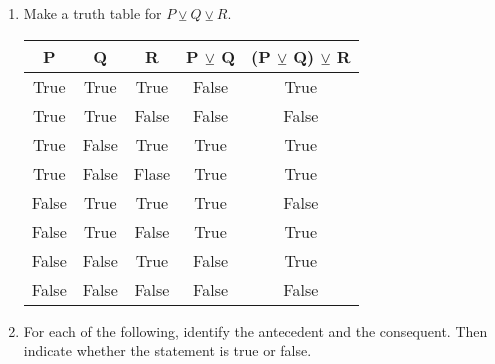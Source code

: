 \documentclass{letter}
\begin{document}
\begin{description}
\begin{enumerate}
\begin{enumerate}
			\end{enumerate}
	\item Make a truth table for $P\veebar Q\veebar R$.
                                  \begin{center}
                                    \begin{tabular}{||c|c|c|c|c||}
                                    \hline
                                    P & Q & R & P $\veebar$ Q & (P $\veebar$ Q) $\veebar$ R\\ \hline
                                    True & True & True & False & True\\ \hline
                                    True & True & False & False & False\\ \hline
                                    True & False & True & True & True\\ \hline
                                    True & False & Flase & True & True\\ \hline
                                    False & True & True & True & False\\ \hline
                                    False & True & False & True & True\\ \hline
                                    False & False & True  & False & True\\ \hline 
                                    False & False & False  & False& False\\ 
                                    \hline
                                    \end{tabular}
                                    \end{center}
	\item For each of the following, identify the antecedent and the consequent. Then indicate whether the statement is true or false.
		\begin{enumerate}
                  

\end{enumerate}
\end{enumerate}
\end{description}
\end{document}
